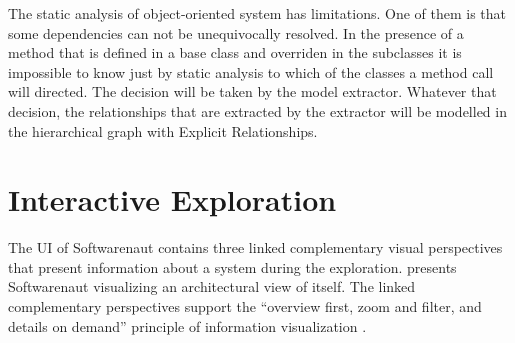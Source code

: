 \documentclass[preprint,12pt]{elsarticle}
\begin{document}
The static analysis of object-oriented system has limitations. One of them is that some dependencies can not be unequivocally resolved. In the presence of a method that is defined in a base class and overriden in the subclasses it is impossible to know just by static analysis to which of the classes a method call will directed. The decision will be taken by the model extractor. Whatever that decision, the relationships that are extracted by the extractor will be modelled in the hierarchical graph with Explicit Relationships.






\section {Interactive Exploration} \label {sec:interact}
The UI of Softwarenaut contains three linked complementary visual perspectives that present information about a system during the exploration.  presents Softwarenaut visualizing an architectural view of itself. The linked complementary perspectives support the ``overview first, zoom and filter, and details on demand'' principle of information visualization \cite{shneid-eyes}. 
\end{document}

